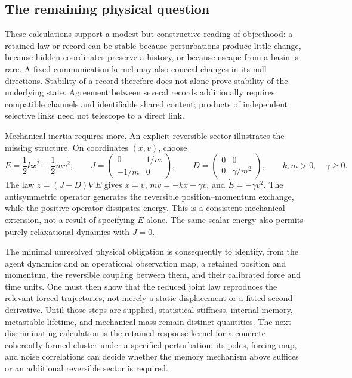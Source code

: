 \subsection{The remaining physical question}
\label{sec:persistence_physical_gap}

These calculations support a modest but constructive reading of objecthood: a retained law or record can be stable because perturbations produce little change, because hidden coordinates preserve a history, or because escape from a basin is rare. A fixed communication kernel may also conceal changes in its null directions. Stability of a record therefore does not alone prove stability of the underlying state. Agreement between several records additionally requires compatible channels and identifiable shared content; products of independent selective links need not telescope to a direct link.

Mechanical inertia requires more. An explicit reversible sector illustrates the missing structure. On coordinates $(x,v)$, choose
\begin{equation}
 E=\frac12kx^2+\frac12mv^2,\qquad
 J=\begin{pmatrix}0&1/m\\-1/m&0\end{pmatrix},\qquad
 D=\begin{pmatrix}0&0\\0&\gamma/m^2\end{pmatrix},
 \qquad k,m>0,\quad\gamma\ge0.
\end{equation}
The law $\dot z=(J-D)\nabla E$ gives $\dot x=v$, $m\dot v=-kx-\gamma v$, and $\dot E=-\gamma v^2$. The antisymmetric operator generates the reversible position--momentum exchange, while the positive operator dissipates energy. This is a consistent mechanical extension, not a result of specifying $E$ alone. The same scalar energy also permits purely relaxational dynamics with $J=0$.

The minimal unresolved physical obligation is consequently to identify, from the agent dynamics and an operational observation map, a retained position and momentum, the reversible coupling between them, and their calibrated force and time units. One must then show that the reduced joint law reproduces the relevant forced trajectories, not merely a static displacement or a fitted second derivative. Until those steps are supplied, statistical stiffness, internal memory, metastable lifetime, and mechanical mass remain distinct quantities. The next discriminating calculation is the retained response kernel for a concrete coherently formed cluster under a specified perturbation; its poles, forcing map, and noise correlations can decide whether the memory mechanism above suffices or an additional reversible sector is required.

